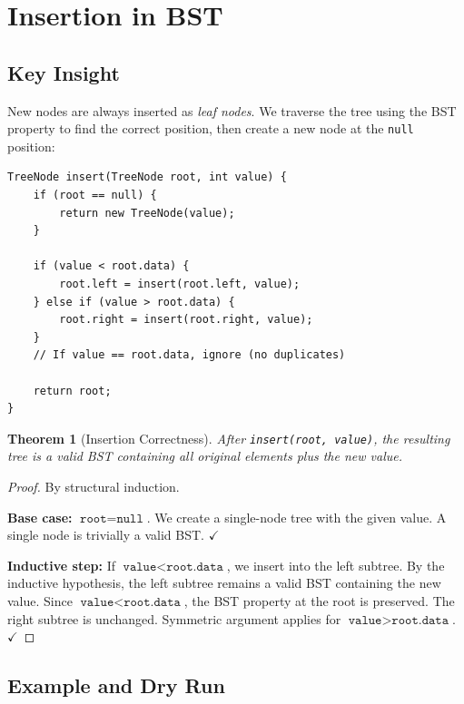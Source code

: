 \documentclass[10pt,journal,compsoc,onecolumn]{IEEEtran}
\newtheorem{theorem}{Theorem}
\begin{document}
\section{Insertion in BST}
\label{sec:insert}

\subsection{Key Insight}

New nodes are always inserted as \emph{leaf nodes}. We traverse the tree using the BST property to find the correct position, then create a new node at the \texttt{null} position:

\begin{verbatim}
TreeNode insert(TreeNode root, int value) {
    if (root == null) {
        return new TreeNode(value);
    }
    
    if (value < root.data) {
        root.left = insert(root.left, value);
    } else if (value > root.data) {
        root.right = insert(root.right, value);
    }
    // If value == root.data, ignore (no duplicates)
    
    return root;
}
\end{verbatim}

\begin{theorem}[Insertion Correctness]
After \texttt{insert(root, value)}, the resulting tree is a valid BST containing all original elements plus the new value.
\end{theorem}

\begin{proof}
By structural induction.

\textbf{Base case:} $\texttt{root} = \texttt{null}$. We create a single-node tree with the given value. A single node is trivially a valid BST. $\checkmark$

\textbf{Inductive step:} If $\texttt{value} < \texttt{root.data}$, we insert into the left subtree. By the inductive hypothesis, the left subtree remains a valid BST containing the new value. Since $\texttt{value} < \texttt{root.data}$, the BST property at the root is preserved. The right subtree is unchanged. Symmetric argument applies for $\texttt{value} > \texttt{root.data}$. $\checkmark$
\end{proof}

\subsection{Example and Dry Run}
\end{document}

